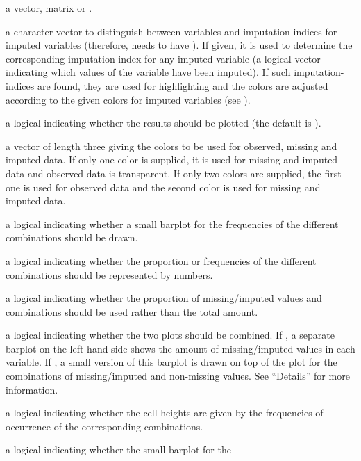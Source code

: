 \begin{Arguments}
\begin{ldescription}
\item[\code{x}] a vector, matrix or .
\item[\code{delimiter}] a character-vector to distinguish between variables
and imputation-indices for imputed variables (therefore,  needs
to have ). If given, it is used to determine the corresponding
imputation-index for any imputed variable (a logical-vector indicating
which values of the variable have been imputed). If such imputation-indices
are found, they are used for highlighting and the colors are adjusted 
according to the given colors for imputed variables (see ).
\item[\code{plot}] a logical indicating whether the results should be plotted 
(the default is ).
\item[\code{col}] a vector of length three giving the colors to be used for 
observed, missing and imputed data. If only one color is supplied, it is 
used for missing and imputed data and observed data is transparent. If 
only two colors are supplied, the first one is used for observed data and
the second color is used for missing and imputed data.
\item[\code{bars}] a logical indicating whether a small barplot for the 
frequencies of the different combinations should be drawn.
\item[\code{numbers}] a logical indicating whether the proportion or frequencies 
of the different combinations should be represented by numbers.
\item[\code{prop}] a logical indicating whether the proportion of missing/imputed values 
and combinations should be used rather than the total amount.
\item[\code{combined}] a logical indicating whether the two plots should be 
combined.  If , a separate barplot on the left hand side shows 
the amount of missing/imputed values in each variable.  If , a small 
version of this barplot is drawn on top of the plot for the combinations of 
missing/imputed and non-missing values.  See ``Details'' for more information.
\item[\code{varheight}] a logical indicating whether the cell heights are given by 
the frequencies of occurrence of the corresponding combinations.
\item[\code{only.miss}] a logical indicating whether the small barplot for the 

\end{ldescription}
\end{Arguments}
